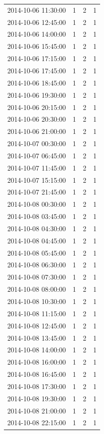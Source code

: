 \begin{tabular}{lrrr}
2014-10-06 11:30:00 & 1 & 2 & 1 \\
2014-10-06 12:45:00 & 1 & 2 & 1 \\
2014-10-06 14:00:00 & 1 & 2 & 1 \\
2014-10-06 15:45:00 & 1 & 2 & 1 \\
2014-10-06 17:15:00 & 1 & 2 & 1 \\
2014-10-06 17:45:00 & 1 & 2 & 1 \\
2014-10-06 18:45:00 & 1 & 2 & 1 \\
2014-10-06 19:30:00 & 1 & 2 & 1 \\
2014-10-06 20:15:00 & 1 & 2 & 1 \\
2014-10-06 20:30:00 & 1 & 2 & 1 \\
2014-10-06 21:00:00 & 1 & 2 & 1 \\
2014-10-07 00:30:00 & 1 & 2 & 1 \\
2014-10-07 06:45:00 & 1 & 2 & 1 \\
2014-10-07 11:45:00 & 1 & 2 & 1 \\
2014-10-07 15:15:00 & 1 & 2 & 1 \\
2014-10-07 21:45:00 & 1 & 2 & 1 \\
2014-10-08 00:30:00 & 1 & 2 & 1 \\
2014-10-08 03:45:00 & 1 & 2 & 1 \\
2014-10-08 04:30:00 & 1 & 2 & 1 \\
2014-10-08 04:45:00 & 1 & 2 & 1 \\
2014-10-08 05:45:00 & 1 & 2 & 1 \\
2014-10-08 06:30:00 & 1 & 2 & 1 \\
2014-10-08 07:30:00 & 1 & 2 & 1 \\
2014-10-08 08:00:00 & 1 & 2 & 1 \\
2014-10-08 10:30:00 & 1 & 2 & 1 \\
2014-10-08 11:15:00 & 1 & 2 & 1 \\
2014-10-08 12:45:00 & 1 & 2 & 1 \\
2014-10-08 13:45:00 & 1 & 2 & 1 \\
2014-10-08 14:00:00 & 1 & 2 & 1 \\
2014-10-08 16:00:00 & 1 & 2 & 1 \\
2014-10-08 16:45:00 & 1 & 2 & 1 \\
2014-10-08 17:30:00 & 1 & 2 & 1 \\
2014-10-08 19:30:00 & 1 & 2 & 1 \\
2014-10-08 21:00:00 & 1 & 2 & 1 \\
2014-10-08 22:15:00 & 1 & 2 & 1 \\

\end{tabular}
